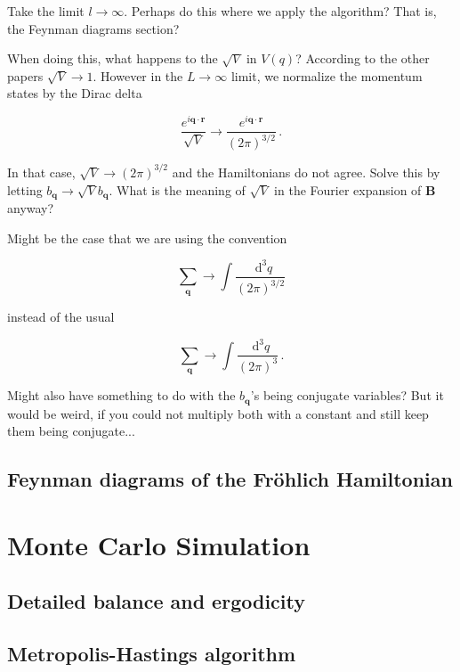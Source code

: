 \documentclass[12pt]{report}
\renewcommand{\vec}[1]{\boldsymbol{\mathbf{#1}}}                        %
\newcommand*\diff{\mathop{}\!\mathrm{d}}
\newcommand{\motivation}[1]{{\leavevmode\color{motivation}#1}}
\newcommand{\question}[1]{{\leavevmode\color{question}#1}}
\newcommand{\todo}[1]{{\leavevmode\color{todo}#1}}
\begin{document}
\todo{Take the limit $ l \rightarrow \infty $. Perhaps do this where we apply the algorithm? That is, the Feynman diagrams section?}
\question{When doing this, what happens to the $ \sqrt V $ in $ V(q) $? According to the other papers $ \sqrt{V} \rightarrow 1 $. However in the $ L \rightarrow \infty $ limit, we normalize the momentum states by the Dirac delta

\begin{equation}
	\frac{e^{i \vec q \cdot \vec r}}{\sqrt V} \rightarrow \frac{e^{i \vec q \cdot \vec r}}{(2 \pi)^{3/2}} \,.
\end{equation}

In that case, $ \sqrt V \rightarrow (2 \pi)^{3/2} $ and the Hamiltonians do not agree. Solve this by letting $ b_{\vec q} \rightarrow \sqrt{V} b_{\vec q} $. What is the meaning of $ \sqrt{V} $ in the Fourier expansion of $ \vec B $ anyway?
}
\motivation{Might be the case that we are using the convention

\begin{equation}
	\sum_{\vec q} \rightarrow \int \frac{\diff^3 q}{(2 \pi)^{3/2}}
\end{equation}

instead of the usual

\begin{equation}
	\sum_{\vec q} \rightarrow \int \frac{\diff^3 q}{(2 \pi)^3} \,.
\end{equation}
}
\question{Might also have something to do with the $ b_{\vec q} $'s being conjugate variables? But it would be weird, if you could not multiply both with a constant and still keep them being conjugate...}

\subsection{Feynman diagrams of the Fröhlich Hamiltonian}



\section{Monte Carlo Simulation}

\subsection{Detailed balance and ergodicity}

\subsection{Metropolis-Hastings algorithm}
\end{document}
